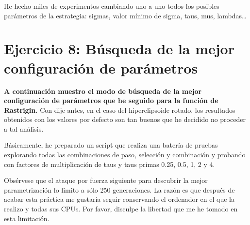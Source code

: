 \documentclass[11pt]{article}
\begin{document}
He hecho miles de experimentos cambiando uno a uno todos los posibles
parámetros de la estrategia: sigmas, valor mínimo de sigma, taus, mus,
lambdas\ldots{}

\section{Ejercicio 8: Búsqueda de la mejor configuración de
parámetros}\label{ejercicio-8-buxfasqueda-de-la-mejor-configuraciuxf3n-de-paruxe1metros}

\textbf{A continuación muestro el modo de búsqueda de la mejor
configuración de parámetros que he seguido para la función de
Rastrigin.} Con dije antes, en el caso del hiperelipsoide rotado, los
resultados obtenidos con los valores por defecto son tan buenos que he
decidido no proceder a tal análisis.

Básicamente, he preparado un script que realiza una batería de pruebas
explorando todas las combinaciones de paso, selección y combinación y
probando con factores de multiplicación de taus y taus primas 0.25, 0.5,
1, 2 y 4.

Obsérvese que el ataque por fuerza siguiente para descubrir la mejor
parametrización lo limito a sólo 250 generaciones. La razón es que
después de acabar esta práctica me gustaría seguir conservando el
ordenador en el que la realizo y todas sus CPUs. Por favor, disculpe la
libertad que me he tomado en esta limitación.
\end{document}
